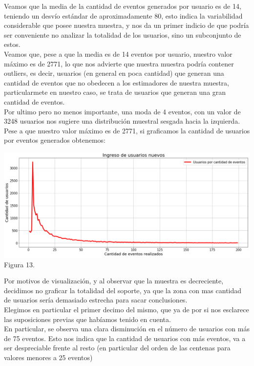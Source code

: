 \documentclass[a4paper ,12pt]{article}
\begin{document}
Veamos que la media de la cantidad de eventos generados por usuario es de 14, teniendo un desvío estándar de aproximadamente 80, esto indica la variabilidad considerable que posee nuestra muestra, y nos da un primer indicio de que podría ser conveniente no analizar la totalidad de los usuarios, sino un subconjunto de estos.\\


Veamos que, pese a que la media es de 14 eventos por usuario, nuestro valor máximo es de 2771, lo que nos advierte que nuestra muestra podría contener outliers, es decir, usuarios (en general en poca cantidad) que generan una cantidad de eventos que no obedecen a los estimadores de nuestra muestra, particularmete en nuestro caso, se trata de usuarios que generan una gran cantidad de eventos.\\


Por ultimo pero no menos importante, una moda de 4 eventos, con un valor de 3248 usuarios nos sugiere una distribución muestral sesgada hacia la izquierda.
Pese a que nuestro valor máximo es de 2771, si graficamos la cantidad de usuarios por eventos generados obtenemos:\\

\begin{center}
	\includegraphics[width=1.1\linewidth]{output_52_0}
	Figura 13.
	
\end{center}

Por motivos de visualización, y al observar que la muestra es decreciente, decidimos no graficar la totalidad del soporte, ya que la zona con mas cantidad de usuarios sería demasiado estrecha para sacar conclusiones.\\


Elegimos en particular el primer decimo del mismo, que ya de por si nos esclarece las suposiciones previas que habíamos tenido en cuenta.\\


En particular, se observa una clara disminución en el número de usuarios con más de 75 eventos. Esto nos indica que la cantidad de usuarios con más eventos, va a ser despreciable frente al resto (en particular del orden de las centenas para valores menores a 25 eventos)\\
\end{document}
